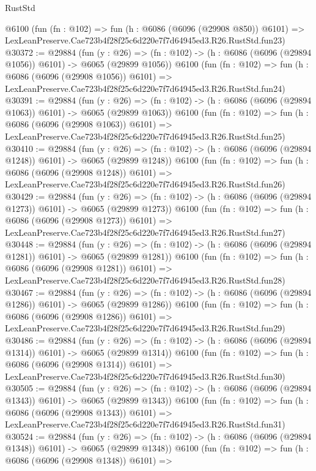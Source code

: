 \begin{lexlean}{RustStd}
\begin{coremodule}
    @6100
    (fun (fn : @102) =>
    fun (h : @6086 (@6096 (@29908 @850)) @6101) =>
    LexLeanPreserve.Cae723b4f28f25c6d220e7f7d64945ed3.R26.RustStd.fun23)
@30372 := @29884
    (fun (y : @26) =>
    (fn : @102) -> (h : @6086 (@6096 (@29894 @1056)) @6101) -> @6065 (@29899 @1056))
    @6100
    (fun (fn : @102) =>
    fun (h : @6086 (@6096 (@29908 @1056)) @6101) =>
    LexLeanPreserve.Cae723b4f28f25c6d220e7f7d64945ed3.R26.RustStd.fun24)
@30391 := @29884
    (fun (y : @26) =>
    (fn : @102) -> (h : @6086 (@6096 (@29894 @1063)) @6101) -> @6065 (@29899 @1063))
    @6100
    (fun (fn : @102) =>
    fun (h : @6086 (@6096 (@29908 @1063)) @6101) =>
    LexLeanPreserve.Cae723b4f28f25c6d220e7f7d64945ed3.R26.RustStd.fun25)
@30410 := @29884
    (fun (y : @26) =>
    (fn : @102) -> (h : @6086 (@6096 (@29894 @1248)) @6101) -> @6065 (@29899 @1248))
    @6100
    (fun (fn : @102) =>
    fun (h : @6086 (@6096 (@29908 @1248)) @6101) =>
    LexLeanPreserve.Cae723b4f28f25c6d220e7f7d64945ed3.R26.RustStd.fun26)
@30429 := @29884
    (fun (y : @26) =>
    (fn : @102) -> (h : @6086 (@6096 (@29894 @1273)) @6101) -> @6065 (@29899 @1273))
    @6100
    (fun (fn : @102) =>
    fun (h : @6086 (@6096 (@29908 @1273)) @6101) =>
    LexLeanPreserve.Cae723b4f28f25c6d220e7f7d64945ed3.R26.RustStd.fun27)
@30448 := @29884
    (fun (y : @26) =>
    (fn : @102) -> (h : @6086 (@6096 (@29894 @1281)) @6101) -> @6065 (@29899 @1281))
    @6100
    (fun (fn : @102) =>
    fun (h : @6086 (@6096 (@29908 @1281)) @6101) =>
    LexLeanPreserve.Cae723b4f28f25c6d220e7f7d64945ed3.R26.RustStd.fun28)
@30467 := @29884
    (fun (y : @26) =>
    (fn : @102) -> (h : @6086 (@6096 (@29894 @1286)) @6101) -> @6065 (@29899 @1286))
    @6100
    (fun (fn : @102) =>
    fun (h : @6086 (@6096 (@29908 @1286)) @6101) =>
    LexLeanPreserve.Cae723b4f28f25c6d220e7f7d64945ed3.R26.RustStd.fun29)
@30486 := @29884
    (fun (y : @26) =>
    (fn : @102) -> (h : @6086 (@6096 (@29894 @1314)) @6101) -> @6065 (@29899 @1314))
    @6100
    (fun (fn : @102) =>
    fun (h : @6086 (@6096 (@29908 @1314)) @6101) =>
    LexLeanPreserve.Cae723b4f28f25c6d220e7f7d64945ed3.R26.RustStd.fun30)
@30505 := @29884
    (fun (y : @26) =>
    (fn : @102) -> (h : @6086 (@6096 (@29894 @1343)) @6101) -> @6065 (@29899 @1343))
    @6100
    (fun (fn : @102) =>
    fun (h : @6086 (@6096 (@29908 @1343)) @6101) =>
    LexLeanPreserve.Cae723b4f28f25c6d220e7f7d64945ed3.R26.RustStd.fun31)
@30524 := @29884
    (fun (y : @26) =>
    (fn : @102) -> (h : @6086 (@6096 (@29894 @1348)) @6101) -> @6065 (@29899 @1348))
    @6100
    (fun (fn : @102) =>
    fun (h : @6086 (@6096 (@29908 @1348)) @6101) =>

\end{coremodule}
\end{lexlean}

